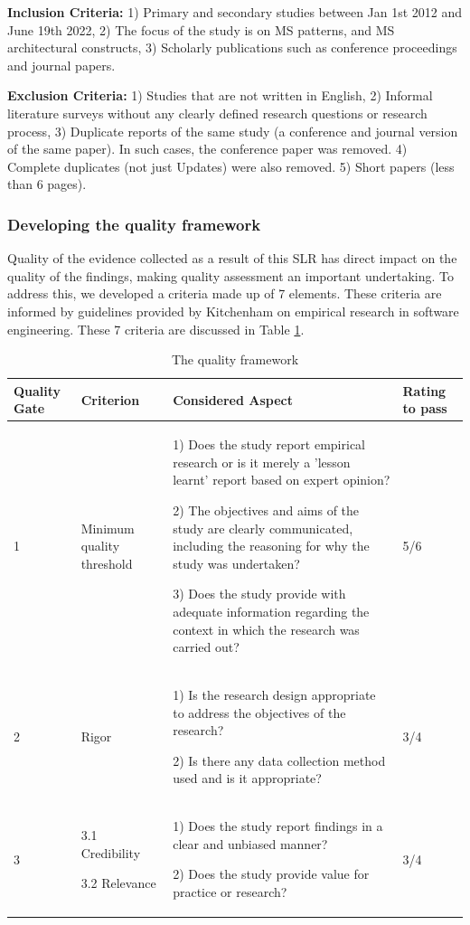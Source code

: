\documentclass{bmcart}
\begin{document}
\textbf{Inclusion Criteria:} 1) Primary and secondary studies between Jan 1st 2012 and June 19th 2022, 2) The focus of the study is on MS patterns, and MS architectural constructs, 3) Scholarly publications such as conference proceedings and journal papers.

\textbf{Exclusion Criteria:} 1) Studies that are not written in English, 2) Informal literature surveys without any clearly defined research questions or research process, 3) Duplicate reports of the same study (a conference and journal version of the same paper). In such cases, the conference paper was removed. 4) Complete duplicates (not just Updates) were also removed. 5) Short papers (less than 6 pages).

\subsubsection{Developing the quality framework}

Quality of the evidence collected as a result of this SLR has direct impact on the quality of the findings, making quality assessment an important undertaking. To address this, we developed a criteria made up of 7 elements. These criteria are informed by guidelines provided by Kitchenham \cite{Kitchenham.2004} on empirical research in software engineering. These 7 criteria are discussed in Table \ref{qualityFramework}.

\begin{table}[h]
  \renewcommand{\arraystretch}{1.5}
  \caption[]{The quality framework}
  \begin{tabular}{|p{0.7cm}|p{2cm}|p{6cm}|p{1.5cm}|}
      \hline
      Quality Gate & Criterion & Considered Aspect & Rating to pass \\ 

      \hline

      1 & Minimum quality threshold & 
      
      1) Does the study report empirical research or is it merely a 'lesson learnt' report based on expert opinion?

      2) The objectives and aims of the study are clearly communicated, including the reasoning for why the study was undertaken?

      3) Does the study provide with adequate information regarding the context in which the research was carried out?
      & 5/6 \\ 
      \hline
      2 & Rigor & 
      
      1) Is the research design appropriate to address the objectives of the research?

      2) Is there any data collection method used and is it appropriate?
      & 3/4 \\ 
      \hline  
      3 &
      3.1 Credibility 

      3.2 Relevance 
      & 
      1) Does the study report findings in a clear and unbiased manner?

      2) Does the study provide value for practice or research?
      & 
      3/4 \\ 
      \hline   
  \end{tabular}
  \label{qualityFramework}
\end{table}
\end{document}

